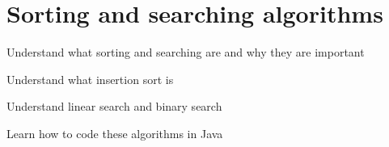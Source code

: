 \chapter{Sorting and searching algorithms}

\begin{goals}
\item Understand what sorting and searching are and why they are important
\item Understand what insertion sort is
\item Understand linear search and binary search
\item Learn how to code these algorithms in Java
\end{goals}

 




